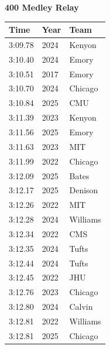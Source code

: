 \noindent\begin{minipage}[t]{0.98\textwidth}
\centering
\textbf{\textcolor{teamprimary}{400 Medley Relay}}\par
\vspace{0.5em}
\centering
\small
\renewcommand{\arraystretch}{1.0}
\setlength{\tabcolsep}{4pt}
\begin{tabular}{@{}p{4.5cm}p{2.5cm}p{4.5cm}@{}}
\toprule
\textbf{Time} & \textbf{Year} & \textbf{Team} \\
\midrule
3:09.78 & 2024 & Kenyon \\
3:10.40 & 2024 & Emory \\
3:10.51 & 2017 & Emory \\
3:10.70 & 2024 & Chicago \\
3:10.84 & 2025 & CMU \\
3:11.39 & 2023 & Kenyon \\
3:11.56 & 2025 & Emory \\
3:11.63 & 2023 & MIT \\
3:11.99 & 2022 & Chicago \\
3:12.09 & 2025 & Bates \\
3:12.17 & 2025 & Denison \\
3:12.26 & 2022 & MIT \\
3:12.28 & 2024 & Williams \\
3:12.34 & 2022 & CMS \\
3:12.35 & 2024 & Tufts \\
3:12.44 & 2024 & Tufts \\
3:12.45 & 2022 & JHU \\
3:12.76 & 2023 & Chicago \\
3:12.80 & 2024 & Calvin \\
3:12.81 & 2022 & Williams \\
3:12.81 & 2025 & Chicago \\
\bottomrule
\end{tabular}
\end{minipage}
\clearpage
